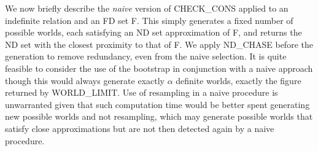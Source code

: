 We now briefly describe the {\em naive} version of CHECK\_CONS applied
to an indefinite relation and an FD set F. This simply
generates a fixed number of possible worlds, each satisfying an ND set
approximation of F, and returns the ND set with
the closest proximity to that of F. We apply ND\_CHASE
before the generation to remove redundancy, even from the naive selection.
It is quite feasible to consider the use of the bootstrap in conjunction
with a naive approach though this would always generate exactly  
$\alpha$ definite worlds, exactly the figure returned by
WORLD\_LIMIT. 
Use of resampling in a naive procedure is unwarranted given that such
computation time would be better spent generating new possible worlds and not
resampling, which may generate possible worlds that satisfy close
approximations but are not then detected again by a naive procedure.


